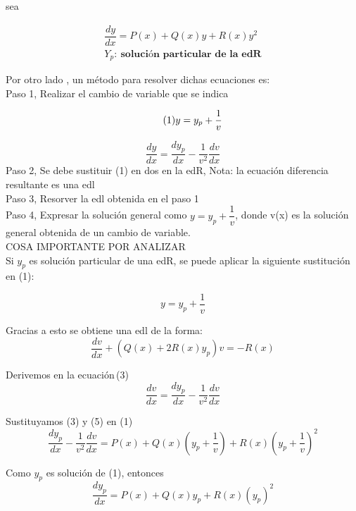 \documentclass[10pt,a4paper]{article}
\begin{document}
sea 
{\begin{align*}
    \dfrac{dy}{dx}=P(x)+Q(x)y+R(x)y^2\\
    Y_p:\ \textbf{solución particular de la edR} 
\end{align*}

Por otro lado , un método para resolver dichas ecuaciones es:
\,\\
Paso 1, Realizar el cambio de variable que se indica\\
{\begin{equation}\tag{1}
y=y_p+\dfrac{1}{v}\\
\end{equation}
{\begin{equation}\tag{2}
\dfrac{dy}{dx}=\dfrac{dy_p}{dx}-\dfrac{1}{v^2}\dfrac{dv}{dx}
\end{equation}
Paso 2, Se debe sustituir (1) en dos en la edR, Nota: la ecuación diferencia resultante es una edl\\
Paso 3, Resorver la edl obtenida en el paso 1\\
Paso 4, Expresar la solución general como $y=y_p+\dfrac{1}{v}$, donde v(x) es la solución general obtenida de un cambio de variable.\\

COSA IMPORTANTE POR ANALIZAR\\
Si $y_p$ es solución particular de una edR, se puede aplicar la siguiente sustitución en (1):

\begin{equation}\tag{3}
y=y_p+\dfrac{1}{v} 
\end{equation}

Gracias a esto se obtiene una edl de la forma:
\begin{equation}\tag{4}
\dfrac{dv}{dx}+(Q(x)+2R(x)y_p)v=-R(x)
\end{equation}

Derivemos en la ecuación\,(3)
\begin{equation}\tag{5}
\dfrac{dv}{dx}=\dfrac{dy_p}{dx}-\dfrac{1}{v^2}\dfrac{dv}{dx}
\end{equation}

Sustituyamos (3) y (5) en (1)
\begin{equation}\tag{6}
\dfrac{dy_p}{dx}-\dfrac{1}{v^2}\dfrac{dv}{dx}=P(x)+Q(x)(y_p+\dfrac{1}{v})+R(x)(y_p+\dfrac{1}{v})^2
\end{equation}

Como $y_p$ es solución de (1), entonces
 \begin{equation}\tag{7}
\dfrac{dy_p}{dx}=P(x)+Q(x)y_p+R(x)(y_p)^2
\end{equation}

}}}
\end{document}
